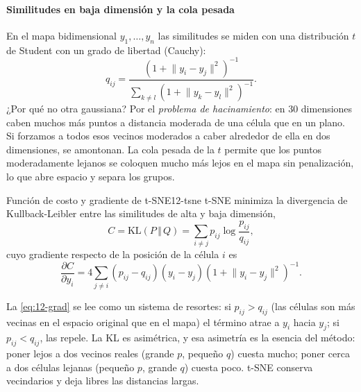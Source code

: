 \paragraph{Similitudes en baja dimensión y la cola pesada} En el mapa bidimensional $y_1,\dots,y_n$ las similitudes se miden con una distribución $t$ de Student con un grado de libertad (Cauchy):
\begin{equation}\label{eq:12-tsne-q}
q_{ij}=\frac{\left(1+\lVert y_i-y_j\rVert^2\right)^{-1}}{\sum_{k\neq l}\left(1+\lVert y_k-y_l\rVert^2\right)^{-1}}.
\end{equation}
¿Por qué no otra gaussiana? Por el \emph{problema de hacinamiento}: en 30 dimensiones caben muchos más puntos a distancia moderada de una célula que en un plano. Si forzamos a todos esos vecinos moderados a caber alrededor de ella en dos dimensiones, se amontonan. La cola pesada de la $t$ permite que los puntos moderadamente lejanos se coloquen mucho más lejos en el mapa sin penalización, lo que abre espacio y separa los grupos.

\begin{teorema}{Función de costo y gradiente de t-SNE}{12-tsne}
t-SNE minimiza la divergencia de Kullback-Leibler entre las similitudes de alta y baja dimensión,
\begin{equation}\label{eq:12-kl}
C=\mathrm{KL}(P\,\Vert\,Q)=\sum_{i\neq j}p_{ij}\log\frac{p_{ij}}{q_{ij}},
\end{equation}
cuyo gradiente respecto de la posición de la célula $i$ es
\begin{equation}\label{eq:12-grad}
\frac{\partial C}{\partial y_i}=4\sum_{j\neq i}\left(p_{ij}-q_{ij}\right)\left(y_i-y_j\right)\left(1+\lVert y_i-y_j\rVert^2\right)^{-1}.
\end{equation}
\end{teorema}
La \cref{eq:12-grad} se lee como un sistema de resortes: si $p_{ij}>q_{ij}$ (las células son más vecinas en el espacio original que en el mapa) el término atrae a $y_i$ hacia $y_j$; si $p_{ij}<q_{ij}$, las repele. La KL es asimétrica, y esa asimetría es la esencia del método: poner lejos a dos vecinos reales (grande $p$, pequeño $q$) cuesta mucho; poner cerca a dos células lejanas (pequeño $p$, grande $q$) cuesta poco. t-SNE conserva vecindarios y deja libres las distancias largas.

